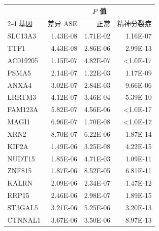 \begin{table}[htbp]
\centering\small
{}
\begin{tabular}{lrrr}
\toprule
&\multicolumn{3}{c}{$P$ 值}\\
\cmidrule(lr){2-4}
基因&差异 ASE&正常&精神分裂症\\
\midrule
SLC13A3&1.43E-08&1.71E-02&1.16E-07\\
TTF1&4.43E-08&2.86E-06&2.99E-13\\
AC019205&1.15E-07&4.82E-07&\textnormal{<1.0E-17}\\
PSMA5&2.14E-07&1.22E-03&1.17E-09\\
ANXA4&3.02E-07&2.84E-03&9.66E-06\\
LRRTM3&4.12E-07&3.46E-04&5.39E-10\\
FAM123A&5.82E-07&4.56E-06&\textnormal{<1.0E-17}\\
MAGI1&6.96E-07&1.70E-08&\textnormal{<1.0E-17}\\
XRN2&8.70E-07&6.22E-06&1.87E-14\\
KIF2A&1.49E-06&3.25E-08&4.22E-15\\
NUDT15&1.85E-06&4.71E-03&1.09E-11\\
ZNF815&1.87E-06&8.52E-05&6.81E-11\\
KALRN&2.09E-06&2.34E-07&1.47E-12\\
RRP15&2.46E-06&2.98E-07&1.89E-15\\
ST3GAL5&3.21E-06&5.25E-06&3.20E-13\\
CTNNAL1&3.67E-06&3.50E-06&8.97E-13\\
\bottomrule
\end{tabular}
\end{table}

